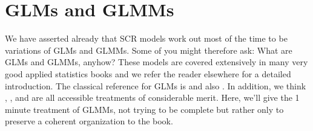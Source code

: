 \section{
GLMs and GLMMs}
\label{glms.sec.glmms}
We have asserted already that SCR models work out most of the time to
be variations of GLMs and GLMMs. Some of you might therefore ask: What
are GLMs and GLMMs, anyhow?   These models are covered extensively in
many very good applied statistics books and we refer the reader
elsewhere for a detailed introduction.  The
classical reference for GLMs is \citet{nelder_wedderburn:1972} and
also \citet{mccullagh_nelder:1989}. In addition, we think \citet{kery:2010},
\citet{kery_schaub:2011}, and \citet{zuur_etal:2009} are all
accessible treatments of considerable merit. 
Here, we'll give the 1
minute
treatment of GLMMs, not trying to be complete but rather only
to preserve a coherent organization to the book.


